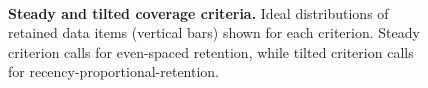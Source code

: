 \begin{figure}
\begin{minipage}[t]{\linewidth}
    \begin{minipage}[]{\textwidth}
    \noindent{}%
    \hspace{-1.5ex}%
    {\vrule width 1pt}%
    \noindent{}%
    {\vrule width 1pt}%
    \noindent{}%
    \end{minipage}
\end{minipage}%
\begin{minipage}[t]{0.04\textwidth}
~
\end{minipage}

\begin{minipage}[t]{\linewidth}
    \vspace{-2ex}%
    \caption{%
      \textbf{Steady and tilted coverage criteria.}
      \footnotesize
      Ideal distributions of retained data items (vertical bars) shown for each criterion.
      Steady criterion calls for even-spaced retention, while tilted criterion calls for recency-proportional-retention.
      }
    \label{fig:criteria-intuition}
\end{minipage}
\end{figure}
